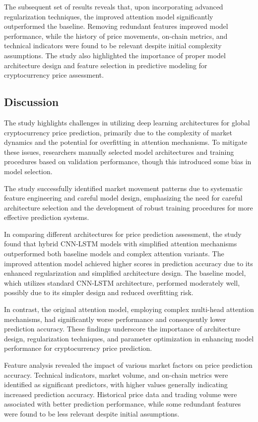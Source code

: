 \documentclass[conference]{IEEEtran}
\begin{document}
The subsequent set of results reveals that, upon incorporating advanced regularization techniques, the improved attention model significantly outperformed the baseline. Removing redundant features improved model performance, while the history of price movements, on-chain metrics, and technical indicators were found to be relevant despite initial complexity assumptions. The study also highlighted the importance of proper model architecture design and feature selection in predictive modeling for cryptocurrency price assessment.

\subsection{Discussion}

The study highlights challenges in utilizing deep learning architectures for global cryptocurrency price prediction, primarily due to the complexity of market dynamics and the potential for overfitting in attention mechanisms. To mitigate these issues, researchers manually selected model architectures and training procedures based on validation performance, though this introduced some bias in model selection.

The study successfully identified market movement patterns due to systematic feature engineering and careful model design, emphasizing the need for careful architecture selection and the development of robust training procedures for more effective prediction systems.

In comparing different architectures for price prediction assessment, the study found that hybrid CNN-LSTM models with simplified attention mechanisms outperformed both baseline models and complex attention variants. The improved attention model achieved higher scores in prediction accuracy due to its enhanced regularization and simplified architecture design. The baseline model, which utilizes standard CNN-LSTM architecture, performed moderately well, possibly due to its simpler design and reduced overfitting risk.

In contrast, the original attention model, employing complex multi-head attention mechanisms, had significantly worse performance and consequently lower prediction accuracy. These findings underscore the importance of architecture design, regularization techniques, and parameter optimization in enhancing model performance for cryptocurrency price prediction.

Feature analysis revealed the impact of various market factors on price prediction accuracy. Technical indicators, market volume, and on-chain metrics were identified as significant predictors, with higher values generally indicating increased prediction accuracy. Historical price data and trading volume were associated with better prediction performance, while some redundant features were found to be less relevant despite initial assumptions.
\end{document}
